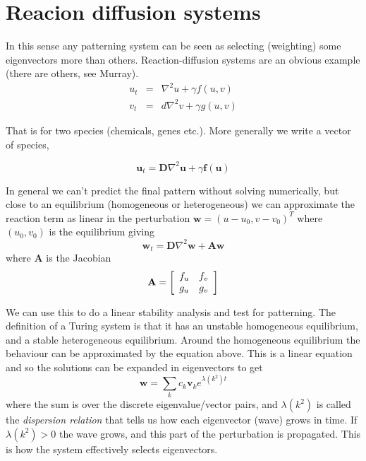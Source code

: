 \documentclass{article}
\renewcommand{\vec}[1]{\mathbf{#1}}
\newcommand{\mat}{\mathbf}
\begin{document}
\section{Reacion diffusion systems}
In this sense any patterning system can be seen as selecting (weighting)
some eigenvectors more than others. Reaction-diffusion systems are an obvious
example (there are others, see Murray). 
\begin{eqnarray}
u_t &=& \nabla^2u + \gamma f(u,v) \\
v_t &=& d \nabla^2v + \gamma g(u,v)
\end{eqnarray}

That is for two species (chemicals, genes etc.). More generally we write a
vector of species,

\begin{equation}
\vec{u}_t = \mat{D}\nabla^2\vec{u} + \gamma \vec{f}(\vec{u})
\end{equation}

In general we can't predict the final pattern
without solving numerically, but close to an equilibrium (homogeneous or
heterogeneous) we can approximate the reaction term as linear in the
perturbation $\vec{w} = (u-u_0,v-v_0)^T$ where $(u_0,v_0)$ is the equilibrium
giving
\begin{equation}
\vec{w}_t = \mat{D}\nabla^2\vec{w} + \mat{A}\vec{w}
\end{equation}
where $\mat{A}$ is the Jacobian
\begin{equation}
\mat{A}=
 \left[
  \begin{array}{ c c }
     f_u & f_v \\
     g_u & g_v
  \end{array} \right]
\end{equation}

We can use this to do a linear stability analysis and test for patterning. The
definition of a Turing system is that it has an unstable homogeneous
equilibrium, and a stable heterogeneous equilibrium. Around the homogeneous
equilibrium the behaviour can be approximated by the equation above. This is a
linear equation and so the solutions can be expanded in eigenvectors to get
\begin{equation}
\vec{w} = \sum_{k} c_k \vec{v}_k e^{\lambda(k^2) t}
\end{equation}
where the sum is over the discrete eigenvalue/vector pairs, 
and $\lambda(k^2)$ is called the \textit{dispersion relation} that tells us how
each eigenvector (wave) grows in time. If $\lambda(k^2)>0$ the wave grows, and
this part of the perturbation is propagated. This is how the system effectively
selects eigenvectors.
\end{document}
